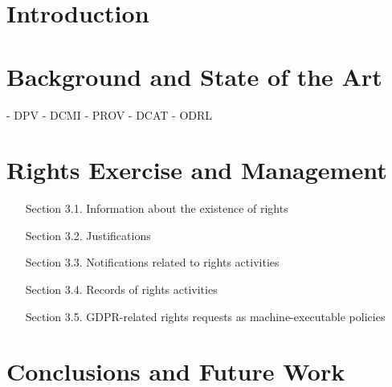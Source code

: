 \documentclass{IOS-Book-Article}     %
\begin{document}
\begin{frontmatter}          %
%
\title{}
\runningtitle{}

\author{\fnms{} \snm{}}
\address{}
\runningauthor{}
%
%
\begin{abstract}

\end{abstract}

\begin{keyword}

\end{keyword}

\end{frontmatter}

\section{Introduction}
\label{sec:intro}

\section{Background and State of the Art}
\label{sec:sota}

- DPV
- DCMI 
- PROV
- DCAT
- ODRL

\section{Rights Exercise and Management}
\label{sec:rights}

\begin{itemize}
    \item[Section 3.1.] Information about the existence of rights
    \item[Section 3.2.] Justifications
    \item[Section 3.3.] Notifications related to rights activities
    \item[Section 3.4.] Records of rights activities
    \item[Section 3.5.] GDPR-related rights requests as machine-executable policies
\end{itemize}

\section{Conclusions and Future Work}
\label{sec:conclusions}



\end{document}
